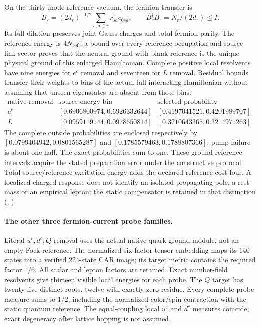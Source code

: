 On the thirty-mode reference vacuum, the fermion transfer is
\[
 B_r=(2d_r)^{-1/2}\sum_{s,a\in r}r^\dagger_{sa}c_{0sa},
 \qquad B_r^\dagger B_r=N_r/(2d_r)\le I.
\]
Its full dilation preserves
joint Gauss charges and total fermion parity. The reference energy is
$4N_{\rm ref}$; a bound over every reference occupation and source link
sector proves that the neutral ground with blank reference is the unique
physical ground of this enlarged Hamiltonian. Complete positive local
resolvents have nine energies for $e^c$ removal and seventeen for $L$
removal. Residual bounds transfer their weights to bins of the actual
full interacting Hamiltonian without assuming that unseen eigenstates
are absent from those bins:
\[
\begin{array}{c|c|c}
\text{native removal}&\text{source energy bin}&\text{selected probability}\\\hline
 e^c &[0.6906800974,0.6926332644]&[0.4197041521,0.4201989707]\\
 L &[0.0959119144,0.0978650814]&[0.3210643365,0.3214971263].
\end{array}
\]
The complete outside probabilities are enclosed respectively by
$[0.0799404942,0.0801565287]$ and $[0.1785579463,0.1788807366]$;
pump failure is about one half. The exact probabilities sum to one.
These ground-reference intervals acquire the stated preparation error
under the constructive protocol. Total source/reference excitation energy
adds the declared reference cost four. A localized charged response does
not identify an isolated propagating pole, a rest mass or an empirical
lepton; the static compensator is retained in that distinction
(, \cite{ophrepo}).

\paragraph{The other three fermion-current probe families.}
Literal $u^c,d^c,Q$ removal uses the actual native quark ground module,
not an empty Fock reference. The normalized six-factor tensor embedding
maps its $140$ states into a verified $224$-state CAR image; its target
metric contains the required factor $1/6$. All scalar and lepton factors
are retained. Exact number-field resolvents give thirteen visible local
energies for each probe. The $Q$ target has twenty-five distinct roots,
twelve with exactly zero residue. Every complete probe measure sums to
$1/2$, including the normalized color/spin contraction with the static
quantum reference. The equal-coupling local $u^c$ and $d^c$ measures
coincide; exact degeneracy after lattice hopping is not assumed.

